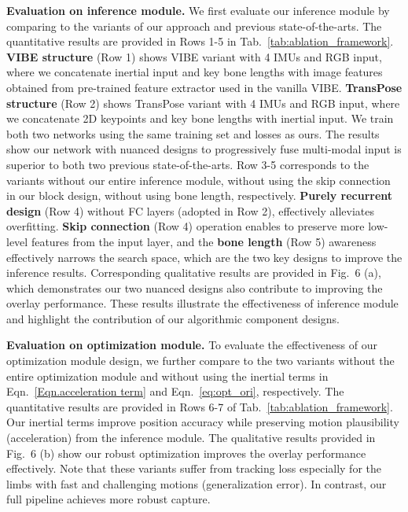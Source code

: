 \documentclass[letterpaper]{article} \usepackage{aaai23}  \usepackage{times}  \usepackage{helvet}  \usepackage{courier}  \usepackage[hyphens]{url}  \usepackage{graphicx} \urlstyle{rm} \def\UrlFont{\rm}  \usepackage{natbib}  \usepackage{caption} \frenchspacing  \setlength{\pdfpagewidth}{8.5in}  \setlength{\pdfpageheight}{11in}  \usepackage{algorithm}
\newcommand{\myparagraph}[1]{\vspace{0.1em}\noindent\textbf{#1}}
\begin{document}
\myparagraph{Evaluation on inference module.}
We first evaluate our inference module by comparing to the variants of our approach and previous state-of-the-arts. The quantitative results are provided in Rows 1-5 in Tab.~\ref{tab:ablation_framework}. \textbf{VIBE structure} (Row 1) shows VIBE variant with 4 IMUs and RGB input, where we concatenate inertial input and key bone lengths with image features obtained from pre-trained feature extractor used in the vanilla VIBE. \textbf{TransPose structure} (Row 2) shows TransPose variant with 4 IMUs and RGB input, where we concatenate 2D keypoints and key bone lengths with inertial input. We train both two networks using the same training set and losses as ours.  
The results show our network with nuanced designs to progressively fuse multi-modal input is superior to both two previous state-of-the-arts. 
Row 3-5 corresponds to the variants without our entire inference module, without using the skip connection in our block design, without using bone length, respectively. 
\textbf{Purely recurrent design} (Row 4) without FC layers (adopted in Row 2), effectively alleviates overfitting. \textbf{Skip connection} (Row 4) operation enables to preserve more low-level features from the input layer, and the \textbf{bone length} (Row 5) awareness effectively narrows the search space, which are the two key designs to improve the inference results. Corresponding qualitative results are provided in Fig.~6 (a), which demonstrates our two nuanced designs also contribute to improving the overlay performance. 
These results illustrate the effectiveness of inference module and highlight the contribution of our algorithmic component designs.



\myparagraph{Evaluation on optimization module.}
To evaluate the effectiveness of our optimization module design, we further compare to the two variants without the entire optimization module and without using the inertial terms in Eqn.~\ref{Eqn.acceleration term} and Eqn.~\ref{eq:opt_ori}, respectively. The quantitative results are provided in Rows 6-7 of Tab.~\ref{tab:ablation_framework}. Our inertial terms improve position accuracy while preserving motion plausibility (acceleration) from the inference module. The qualitative results provided in Fig.~6 (b) show our robust optimization improves the overlay performance effectively. Note that these variants suffer from tracking loss especially for the limbs with fast and challenging motions (generalization error). In contrast, our full pipeline achieves more robust capture.
\end{document}
